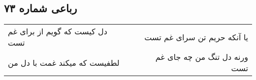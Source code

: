 \begin{center}
\section*{رباعی شماره ۷۳}
\label{sec:sh073}
\begin{longtable}{l p{0.5cm} r}
دل کیست که گویم از برای غم تست
&&
یا آنکه حریم تن سرای غم تست
\\
لطفیست که میکند غمت با دل من
&&
ورنه دل تنگ من چه جای غم تست
\\
\end{longtable}
\end{center}
